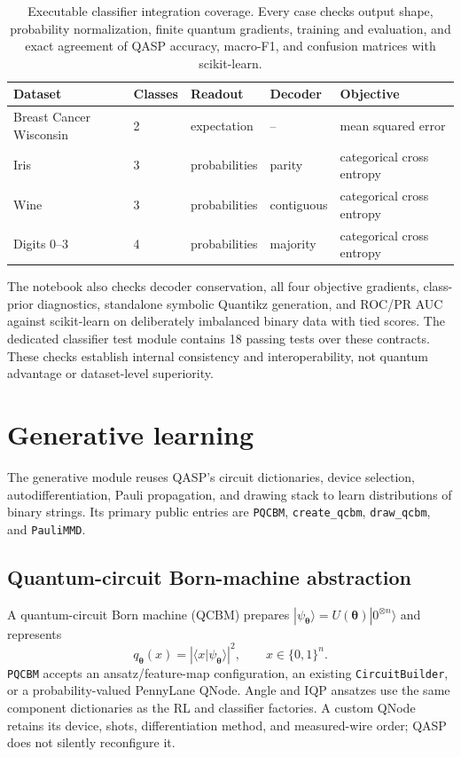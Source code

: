 \documentclass[10pt]{article}
\newcommand{\code}[1]{\texttt{#1}}
\begin{document}
\begin{table}[H]
\centering
\caption{Executable classifier integration coverage.  Every case checks output
shape, probability normalization, finite quantum gradients, training and
evaluation, and exact agreement of QASP accuracy, macro-F1, and confusion
matrices with scikit-learn.}
\label{tab:classifier-validation}
\small
\begin{tabularx}{\textwidth}{@{}p{}p{}p{}p{}X@{}}
\toprule
Dataset & Classes & Readout & Decoder & Objective \\
\midrule
Breast Cancer Wisconsin & 2 & expectation & -- & mean squared error \\
Iris & 3 & probabilities & parity & categorical cross entropy \\
Wine & 3 & probabilities & contiguous & categorical cross entropy \\
Digits $0$--$3$ & 4 & probabilities & majority & categorical cross entropy \\
\bottomrule
\end{tabularx}
\end{table}

The notebook also checks decoder conservation, all four objective gradients,
class-prior diagnostics, standalone symbolic Quantikz generation, and ROC/PR
AUC against scikit-learn on deliberately imbalanced binary data with tied
scores.  The dedicated classifier test module contains 18 passing tests over
these contracts.  These checks establish internal consistency and
interoperability, not quantum advantage or dataset-level superiority.

\section{Generative learning}
\label{sec:generative}

The generative module reuses QASP's circuit dictionaries, device selection,
autodifferentiation, Pauli propagation, and drawing stack to learn distributions
of binary strings.  Its primary public entries are \code{PQCBM},
\code{create\_qcbm}, \code{draw\_qcbm}, and \code{PauliMMD}.

\subsection{Quantum-circuit Born-machine abstraction}

A quantum-circuit Born machine (QCBM) prepares
$|\psi_{\bm\theta}\rangle=U(\bm\theta)|0^{\otimes n}\rangle$ and represents
\begin{equation}
  q_{\bm{\theta}}(x)
  =\left|\langle x|\psi_{\bm\theta}\rangle\right|^2,
  \qquad x\in\{0,1\}^{n}.
  \label{eq:pqcbm-born}
\end{equation}
\code{PQCBM} accepts an ansatz/feature-map configuration, an existing
\code{CircuitBuilder}, or a probability-valued PennyLane QNode.  Angle and IQP
ansatzes use the same component dictionaries as the RL and classifier
factories.  A custom QNode retains its device, shots, differentiation method,
and measured-wire order; QASP does not silently reconfigure it.
\end{document}
